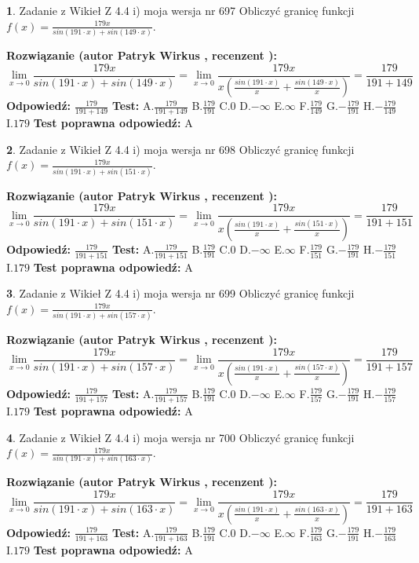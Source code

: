 \documentclass[12pt, a4paper]{article}
\theoremstyle{definition} %
\newtheorem{zad}{}
\newcommand{\zadStart}[1]{\begin{zad}#1\newline}
\newcommand{\zadStop}{\end{zad}}
\newcommand{\rozwStart}[2]{\noindent \textbf{Rozwiązanie (autor #1 , recenzent #2): }\newline}
\newcommand{\rozwStop}{\newline}
\newcommand{\odpStart}{\noindent \textbf{Odpowiedź:}\newline}
\newcommand{\odpStop}{\newline}
\newcommand{\testStart}{\noindent \textbf{Test:}\newline}
\newcommand{\testStop}{\newline}
\newcommand{\kluczStart}{\noindent \textbf{Test poprawna odpowiedź:}\newline}
\newcommand{\kluczStop}{\newline}
\begin{document}
\zadStart{Zadanie z Wikieł Z 4.4 i) moja wersja nr 697}
Obliczyć granicę funkcji $f(x)=\frac{179x}{sin(191\cdot x) +sin(149\cdot x)}$.
\zadStop
\rozwStart{Patryk Wirkus}{}
$$\lim\limits_{x\to 0}\frac{179x}{sin(191\cdot x) +sin(149\cdot x)}=\lim\limits_{x\to 0}\frac{179x}{x(\frac{sin(191\cdot x)}{x}+\frac{sin(149\cdot x)}{x})}=\frac{179}{191+149}$$
\rozwStop
\odpStart
$\frac{179}{191+149}$
\odpStop
\testStart
A.$\frac{179}{191+149}$
B.$\frac{179}{191}$
C.$0$
D.$-\infty$
E.$\infty$
F.$\frac{179}{149}$
G.$-\frac{179}{191}$
H.$-\frac{179}{149}$
I.$179$
\testStop
\kluczStart
A
\kluczStop



\zadStart{Zadanie z Wikieł Z 4.4 i) moja wersja nr 698}
Obliczyć granicę funkcji $f(x)=\frac{179x}{sin(191\cdot x) +sin(151\cdot x)}$.
\zadStop
\rozwStart{Patryk Wirkus}{}
$$\lim\limits_{x\to 0}\frac{179x}{sin(191\cdot x) +sin(151\cdot x)}=\lim\limits_{x\to 0}\frac{179x}{x(\frac{sin(191\cdot x)}{x}+\frac{sin(151\cdot x)}{x})}=\frac{179}{191+151}$$
\rozwStop
\odpStart
$\frac{179}{191+151}$
\odpStop
\testStart
A.$\frac{179}{191+151}$
B.$\frac{179}{191}$
C.$0$
D.$-\infty$
E.$\infty$
F.$\frac{179}{151}$
G.$-\frac{179}{191}$
H.$-\frac{179}{151}$
I.$179$
\testStop
\kluczStart
A
\kluczStop



\zadStart{Zadanie z Wikieł Z 4.4 i) moja wersja nr 699}
Obliczyć granicę funkcji $f(x)=\frac{179x}{sin(191\cdot x) +sin(157\cdot x)}$.
\zadStop
\rozwStart{Patryk Wirkus}{}
$$\lim\limits_{x\to 0}\frac{179x}{sin(191\cdot x) +sin(157\cdot x)}=\lim\limits_{x\to 0}\frac{179x}{x(\frac{sin(191\cdot x)}{x}+\frac{sin(157\cdot x)}{x})}=\frac{179}{191+157}$$
\rozwStop
\odpStart
$\frac{179}{191+157}$
\odpStop
\testStart
A.$\frac{179}{191+157}$
B.$\frac{179}{191}$
C.$0$
D.$-\infty$
E.$\infty$
F.$\frac{179}{157}$
G.$-\frac{179}{191}$
H.$-\frac{179}{157}$
I.$179$
\testStop
\kluczStart
A
\kluczStop



\zadStart{Zadanie z Wikieł Z 4.4 i) moja wersja nr 700}
Obliczyć granicę funkcji $f(x)=\frac{179x}{sin(191\cdot x) +sin(163\cdot x)}$.
\zadStop
\rozwStart{Patryk Wirkus}{}
$$\lim\limits_{x\to 0}\frac{179x}{sin(191\cdot x) +sin(163\cdot x)}=\lim\limits_{x\to 0}\frac{179x}{x(\frac{sin(191\cdot x)}{x}+\frac{sin(163\cdot x)}{x})}=\frac{179}{191+163}$$
\rozwStop
\odpStart
$\frac{179}{191+163}$
\odpStop
\testStart
A.$\frac{179}{191+163}$
B.$\frac{179}{191}$
C.$0$
D.$-\infty$
E.$\infty$
F.$\frac{179}{163}$
G.$-\frac{179}{191}$
H.$-\frac{179}{163}$
I.$179$
\testStop
\kluczStart
A
\kluczStop
\end{document}

